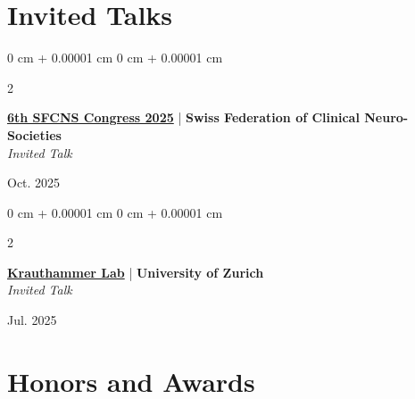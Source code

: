 \documentclass[11pt, letterpaper]{article}
\newenvironment{onecolentry}{
    \Needspace{3\baselineskip}
    \begin{adjustwidth}{
        0 cm + 0.00001 cm
    }{
        0 cm + 0.00001 cm
    }
}{
    \end{adjustwidth}
} %
\newenvironment{twocolentry}[2][]{
    \onecolentry
    \def\secondColumn{#2}
    \setcolumnwidth{\fill, 4.8 cm}
    \begin{paracol}{2}
}{
    \switchcolumn \raggedleft \secondColumn
    \end{paracol}
    \endonecolentry
} %
\begin{document}
%
%
%
%

\section{Invited Talks}
\vspace{0.2 cm}

\begin{twocolentry}{Oct. 2025}
    \href{https://sfcns2025.congress-imk.ch/}{\textbf{6th SFCNS Congress 2025}} | \textbf{Swiss Federation of Clinical Neuro-Societies} \\
    \textit{Invited Talk}
\end{twocolentry}
\vspace{0.3 cm}

\begin{twocolentry}{Jul. 2025}
\href{https://krauthammerlab.ch/}{\textbf{Krauthammer Lab}} | \textbf{University of Zurich} \\
\textit{Invited Talk}
\end{twocolentry}
\vspace{0.3 cm}

\section{Honors and Awards}
    \vspace{0.2 cm}
\end{document}
